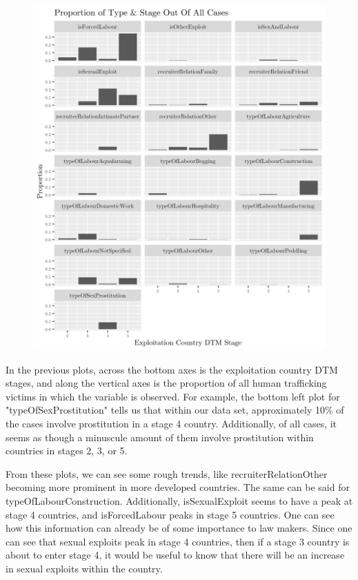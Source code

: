 \documentclass{article} %
\begin{document}
\FloatBarrier
\begin{figure}[H]
	\includegraphics[width = \textwidth]{FacetPlot1}
\end{figure}
\FloatBarrier

In the previous plots, across the bottom axes is the exploitation country DTM stages, and along the vertical axes is the proportion of all human trafficking victims in which the variable is observed. For example, the bottom left plot for "typeOfSexProstitution" tells us that within our data set, approximately 10\% of the cases involve prostitution in a stage 4 country. Additionally, of all cases, it seems as though a minuscule amount of them involve prostitution within countries in stages 2, 3, or 5.

From these plots, we can see some rough trends, like recruiterRelationOther becoming more prominent in more developed countries. The same can be said for typeOfLabourConstruction. Additionally, isSexualExploit seems to have a peak at stage 4 countries, and isForcedLabour peaks in stage 5 countries. One can see how this information can already be of some importance to law makers. Since one can see that sexual exploits peak in stage 4 countries, then if a stage 3 country is about to enter stage 4, it would be useful to know that there will be an increase in sexual exploits within the country.



\printbibliography
\end{document}
